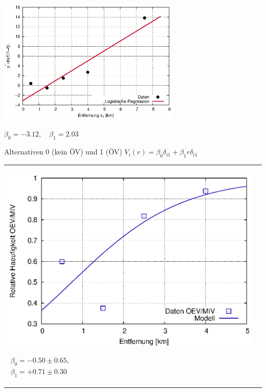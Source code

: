 \documentclass[a4paper]{foils}
\begin{document}
\begin{landscape}
\begin{center}
{\begin{center}
\includegraphics[width=0.65\textwidth]{figsRegr/regr_logistic_WS1516cum_alt.eps}
\end{center}
}

 {\small $ \beta_0=-3.12, \quad \beta_1=2.03 $}

\newpage

\vspace{0em}  


{\small Alternativen 0 (kein \"OV) und 1 (\"OV) \quad
$V_i(r)=\beta_0 \delta_{i1} + \beta_1 r \delta_{i1}$}

\begin{tabular}{ll}
\parbox{1.00\textwidth}{
\includegraphics[width=1.0\textwidth]{figsRegr/revealedChoiceWS1516cum_2al_4dataPoints_fProb_r.eps}
}
\parbox{0.30\textwidth}{
 {\small
 $
 \begin{array}{l}
 \beta_0=-0.50\pm 0.65,\\
 \beta_1=+0.71\pm 0.30
 \end{array}
 $
}}
\end{tabular}


\end{center}
\end{landscape}
\end{document}

